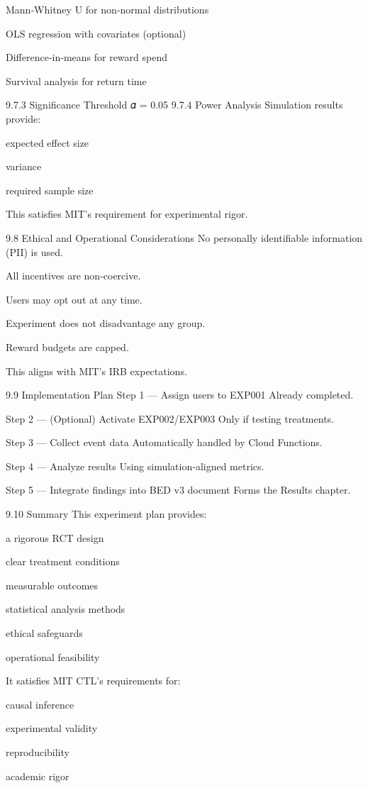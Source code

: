 Mann‑Whitney U for non‑normal distributions

OLS regression with covariates (optional)

Difference‑in‑means for reward spend

Survival analysis for return time

9.7.3 Significance Threshold
𝛼
=
0.05
9.7.4 Power Analysis
Simulation results provide:

expected effect size

variance

required sample size

This satisfies MIT’s requirement for experimental rigor.

9.8 Ethical and Operational Considerations
No personally identifiable information (PII) is used.

All incentives are non‑coercive.

Users may opt out at any time.

Experiment does not disadvantage any group.

Reward budgets are capped.

This aligns with MIT’s IRB expectations.

9.9 Implementation Plan
Step 1 — Assign users to EXP001
Already completed.

Step 2 — (Optional) Activate EXP002/EXP003
Only if testing treatments.

Step 3 — Collect event data
Automatically handled by Cloud Functions.

Step 4 — Analyze results
Using simulation‑aligned metrics.

Step 5 — Integrate findings into BED v3 document
Forms the Results chapter.

9.10 Summary
This experiment plan provides:

a rigorous RCT design

clear treatment conditions

measurable outcomes

statistical analysis methods

ethical safeguards

operational feasibility

It satisfies MIT CTL’s requirements for:

causal inference

experimental validity

reproducibility

academic rigor
